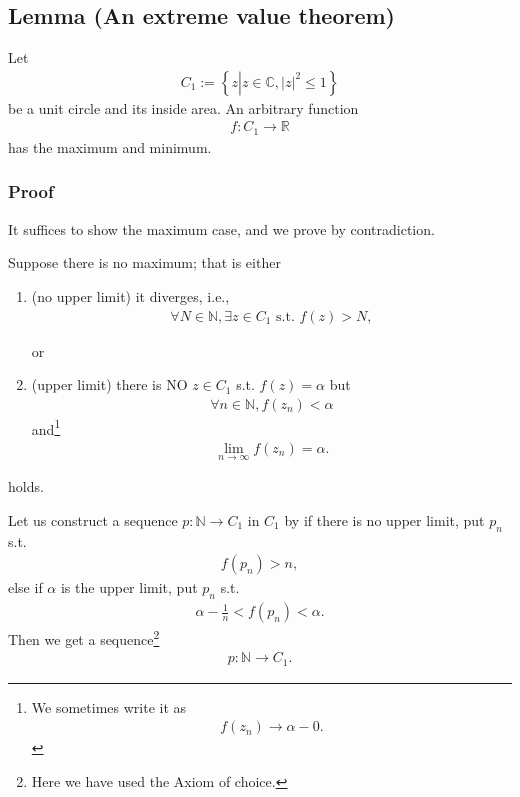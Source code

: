 \documentclass[11pt]{book}
\begin{document}
\subsection{Lemma (An extreme value theorem)}
\label{aLemmaForFundamentalTheoremInAlgebra}
Let
\begin{eqnarray}
C_1 := \left\{z \left| z \in \mathbb{C}, |z|^2 \leq 1 \right.\right\}
\end{eqnarray}
be a unit circle and its inside area.
An arbitrary function
\begin{eqnarray}
f: C_1 \to \mathbb{R}
\end{eqnarray}
has the maximum and minimum.

\subsubsection{Proof}
It suffices to show the maximum case, and we prove by contradiction.

Suppose there is no maximum; that is either
\begin{enumerate}

\item (no upper limit)
\label{noUpperLimit}
it diverges, i.e.,
\begin{eqnarray}
\forall N \in \mathbb{N}, \exists z \in C_1 \text{ s.t. } f(z) > N,
\end{eqnarray}

or

\item (upper limit)
\label{upperLimit}
there is NO $z \in C_1$ s.t. $f(z) = \alpha$ but
\begin{eqnarray}
\forall n \in \mathbb{N}, f(z_n) < \alpha
\end{eqnarray}
and\footnote{
We sometimes write it as
\begin{eqnarray}
f(z_n) \to \alpha - 0.
\end{eqnarray}
}
\begin{eqnarray}
\lim_{n \to \infty} f(z_n) = \alpha.
\end{eqnarray}

\end{enumerate}
holds.

Let us construct a sequence $p: \mathbb{N} \to C_1$ in $C_1$ by if there is no upper limit, put $p_n$ s.t.
\begin{eqnarray}
f(p_n) > n,
\end{eqnarray}
else if $\alpha$ is the upper limit, put $p_n$ s.t.
\begin{eqnarray}
\alpha - \frac{1}{n} < f(p_n) < \alpha.
\end{eqnarray}
Then we get a sequence\footnote{Here we have used the Axiom of choice.}
\begin{eqnarray}
p: \mathbb{N} \to C_1.
\end{eqnarray}
\end{document}
